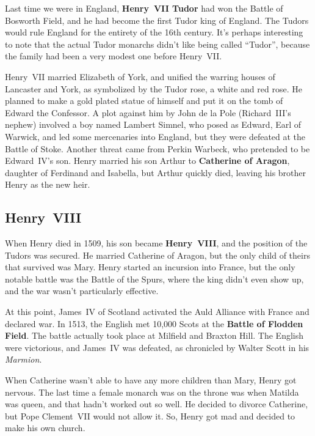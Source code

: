 Last time we were in England, \textbf{Henry~VII Tudor} had won the Battle of Bosworth Field,
and he had become the first Tudor king of England.
The Tudors would rule England for the entirety of the 16th century.
It's perhaps interesting to note that the actual Tudor monarchs didn't like being called ``Tudor'',
because the family had been a very modest one before Henry~VII\@.

Henry~VII married Elizabeth of York, and unified the warring houses of Lancaster and York,
as symbolized by the Tudor rose, a white and red rose.
He planned to make a gold plated statue of himself and put it on the tomb of Edward the Confessor.
A plot against him by John de la Pole (Richard~III's nephew) involved a boy named Lambert Simnel,
who posed as Edward, Earl of Warwick,
and led some mercenaries into England, but they were defeated at the Battle of Stoke.
Another threat came from Perkin Warbeck, who pretended to be Edward~IV's son.
Henry married his son Arthur to \textbf{Catherine of Aragon}, daughter of Ferdinand and Isabella,
but Arthur quickly died, leaving his brother Henry as the new heir.

\subsection*{Henry~VIII}

When Henry died in 1509, his son became \textbf{Henry~VIII}, and the position of the Tudors was secured.
He married Catherine of Aragon, but the only child of theirs that survived was Mary.
Henry started an incursion into France, but the only notable battle was the Battle of the Spurs,
where the king didn't even show up, and the war wasn't particularly effective.

At this point, James~IV of Scotland activated the Auld Alliance with France and declared war.
In 1513, the English met 10,000 Scots at the \textbf{Battle of Flodden Field}.
The battle actually took place at Milfield and Braxton Hill.
The English were victorious, and James~IV was defeated, as chronicled by Walter Scott in his \textit{Marmion}.

When Catherine wasn't able to have any more children than Mary, Henry got nervous.
The last time a female monarch was on the throne was when Matilda was queen,
and that hadn't worked out so well.
He decided to divorce Catherine, but Pope Clement~VII would not allow it.
So, Henry got mad and decided to make his own church.

